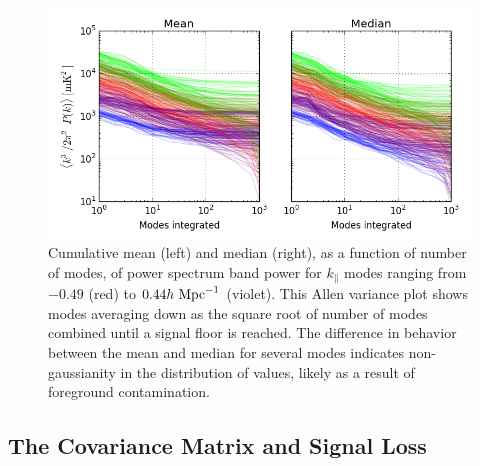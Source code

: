 \documentclass[twocolumn,numberedappendix]{emulateapj} \shorttitle{PSA64}
\begin{document}
\begin{figure}[t!]\centering
\includegraphics[width=1.8\columnwidth]{plots/pspec_variance.png}
\caption{
Cumulative mean (left) and median (right), as a function of number of modes,
of power spectrum band power for
$k_\parallel$ modes ranging from $-0.49$ (red) to $0.44h\ {\rm Mpc}^{-1}$ (violet).
This Allen variance plot shows modes averaging down as the square root of
number of modes combined until a signal floor is reached.  The difference in
behavior between the mean and median for several modes indicates non-gaussianity
in the distribution of values, likely as a result of foreground contamination.
}\label{fig:pspec_variance}
\end{figure}


\subsection{The Covariance Matrix and Signal Loss}
\label{sec:sigloss}
%
\end{document}
